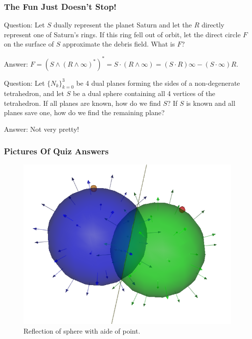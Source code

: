 \documentclass{beamer}
\newcommand{\nvai}{\infty}
\begin{document}
\begin{frame}
\frametitle{The Fun Just Doesn't Stop!}
\alert{Question}: Let $S$ \alert{dually} represent the planet Saturn and let the $R$ \alert{directly} represent
one of Saturn's rings.  If this ring fell out of orbit, let the \alert{direct} circle $F$ on the surface of $S$ approximate
the debris field.  What is $F$?\pause

\alert{Answer}: $F = (S\wedge (R\wedge\nvai)^*)^* = S\cdot (R\wedge\nvai) = (S\cdot R)\nvai - (S\cdot\nvai)R$.\pause

\alert{Question}: Let $\{N_k\}_{k=0}^3$ be 4 \alert{dual} planes forming the sides of
a non-degenerate tetrahedron, and let $S$ be a \alert{dual} sphere containing all
4 vertices of the tetrahedron.  If all planes are known, how do we find $S$?
If $S$ is known and all planes save one, how do we find the remaining plane?\pause

\alert{Answer}: Not very pretty!

\end{frame}

\begin{frame}
\frametitle{Pictures Of Quiz Answers}
\begin{figure}
\centering
\includegraphics[scale=0.4]{SphereReflectionAboutPlane}
\caption{Reflection of sphere with aide of point.}
\end{figure}
\end{frame}
\end{document}
